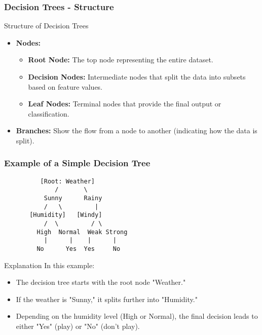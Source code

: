 \documentclass[aspectratio=169]{beamer}
\begin{document}
\begin{frame}[fragile]
    \frametitle{Decision Trees - Structure}
    \begin{block}{Structure of Decision Trees}
        \begin{itemize}
            \item \textbf{Nodes:}
                \begin{itemize}
                    \item \textbf{Root Node:} The top node representing the entire dataset.
                    \item \textbf{Decision Nodes:} Intermediate nodes that split the data into subsets based on feature values.
                    \item \textbf{Leaf Nodes:} Terminal nodes that provide the final output or classification.
                \end{itemize}
            \item \textbf{Branches:} Show the flow from a node to another (indicating how the data is split).
        \end{itemize}
    \end{block}
\end{frame}

\begin{frame}[fragile]
    \frametitle{Example of a Simple Decision Tree}
    \begin{center}
        \begin{verbatim}
          [Root: Weather]
              /       \
           Sunny      Rainy
           /   \         |
       [Humidity]   [Windy]
           /  \         / \
         High  Normal  Weak Strong
           |      |    |      |
         No      Yes  Yes     No
        \end{verbatim}
    \end{center}
    \begin{block}{Explanation}
        In this example:
        \begin{itemize}
            \item The decision tree starts with the root node "Weather."
            \item If the weather is "Sunny," it splits further into "Humidity."
            \item Depending on the humidity level (High or Normal), the final decision leads to either "Yes" (play) or "No" (don't play).
        \end{itemize}
    \end{block}
\end{frame}
\end{document}
